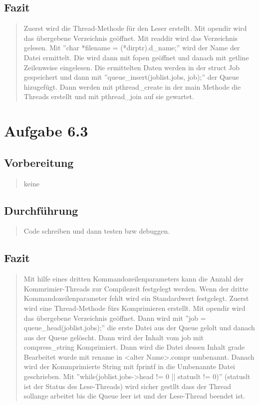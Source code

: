 	\subsection{Fazit}
		\begin{quote}
			\tiny
			Zuerst wird die Thread-Methode f\"ur den Leser erstellt. Mit opendir wird das \"ubergebene Verzeichnis ge\"offnet. Mit readdir wird das Verzeichnis gelesen. Mit ''char *filename = (*dirptr).d\_name;'' wird der Name der Datei ermittelt. Die wird dann mit fopen ge\"offnet und danach mit getline Zeilenweise eingelesen. Die ermittelten Daten werden in der struct Job gespeichert und dann mit ''queue\_insert(joblist.jobs, job);'' der Queue hizugef\"ugt. Dann werden mit pthread\_create in der main Methode die Threads erstellt und mit pthread\_join auf sie gewartet.\\
		\end{quote}

\section{Aufgabe 6.3}
	\subsection{Vorbereitung}
		\begin{quote}
			keine
		\end{quote}
	\subsection{Durchführung}
		\begin{quote}
			Code schreiben und dann testen bzw debuggen.
		\end{quote}
	\subsection{Fazit}
		\begin{quote}
			\tiny
			Mit hilfe eines dritten Kommandozeilenparameters kann die Anzahl der Kommrimier-Threads zur Compilezeit festgelegt werden. Wenn der dritte Kommandozeilenparameter fehlt wird ein Standardwert festgelegt. 
			\tiny
			Zuerst wird eine Thread-Methode f\"urs Komprimieren erstellt. Mit opendir wird das \"ubergebene Verzeichnis ge\"offnet. Dann wird mit ''job = queue\_head(joblist.jobs);'' die erste Datei aus der Queue gelolt und danach aus der Queue gel\"oscht. Dann wird der Inhalt vom job mit compress\_string Komprimiert. Dann wird die Datei dessen Inhalt grade Bearbeitet wurde mit rename in <alter Name>.compr umbenannt. Danach wird der Kommprimierte String mit fprintf in die Umbenannte Datei geschrieben. Mit ''while(joblist.jobs->head != 0 || statuslt != 0)'' (statuslt ist der Status des Lese-Threads) wird sicher gestllt dass der Thread sollange arbeitet bis die Queue leer ist und der Lese-Thread beendet ist.\\
		\end{quote}

